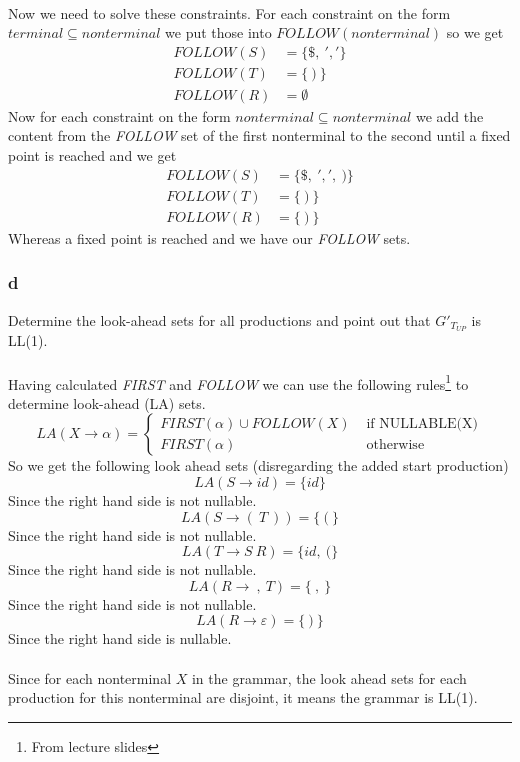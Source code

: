 \documentclass[12pt]{article}
\begin{document}
\\
Now we need to solve these constraints. For each constraint on the form $terminal \subseteq nonterminal$ we put those into $FOLLOW(nonterminal)$ so we get
\begin{align*}
FOLLOW(S) &= \{\$,\:','\} \\ 
FOLLOW(T) &= \{\:)\:\} \\
FOLLOW(R) &= \emptyset
\end{align*}
Now for each constraint on the form $nonterminal \subseteq nonterminal$ we add the content from the \textit{FOLLOW} set of the first nonterminal to the second until a fixed point is reached and we get
\begin{align*}
FOLLOW(S) &= \{\$,\:',',\:)\} \\
FOLLOW(T) &= \{\:)\:\} \\
FOLLOW(R) &= \{\:)\:\}
\end{align*}
Whereas a fixed point is reached and we have our \textit{FOLLOW} sets.

\subsubsection{d}
Determine the look-ahead sets for all productions and point out that $G'_{T_{UP}}$ is LL(1).\\
\\
Having calculated \textit{FIRST} and \textit{FOLLOW} we can use the following rules\footnote{From lecture slides} to determine look-ahead (LA) sets.
$$
LA(X\rightarrow \alpha) = \left\{ \begin{array}{rl}
FIRST(\alpha) \cup FOLLOW(X) &\mbox{ if NULLABLE(X)} \\
FIRST(\alpha) &\mbox{ otherwise}
\end{array} \right.
$$
So we get the following look ahead sets (disregarding the added start production) \\
$$LA(S \rightarrow id) = \{id\}$$
Since the right hand side is not nullable.
$$LA(S \rightarrow (\:T\:)) = \{\:(\:\}$$
Since the right hand side is not nullable.
$$LA(T \rightarrow S\:R) = \{id,\:(\}$$
Since the right hand side is not nullable.
$$LA(R \rightarrow \:,\:T) = \{\:,\:\}$$
Since the right hand side is not nullable.
$$LA(R \rightarrow \varepsilon) = \{\:)\:\}$$
Since the right hand side is nullable.\\
\\
Since for each nonterminal $X$ in the grammar, the look ahead sets for each production for this nonterminal are disjoint, it means the grammar is LL(1).
\end{document}
